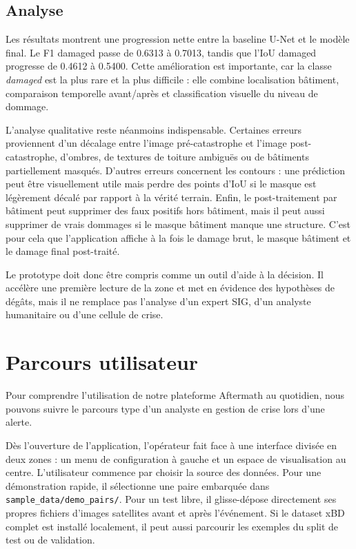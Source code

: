 \documentclass[french,12pt]{article}
\begin{document}
\subsection{Analyse}

Les résultats montrent une progression nette entre la baseline U-Net et le modèle final. Le F1 damaged passe de 0.6313 à 0.7013, tandis que l'IoU damaged progresse de 0.4612 à 0.5400. Cette amélioration est importante, car la classe \textit{damaged} est la plus rare et la plus difficile : elle combine localisation bâtiment, comparaison temporelle avant/après et classification visuelle du niveau de dommage.

L'analyse qualitative reste néanmoins indispensable. Certaines erreurs proviennent d'un décalage entre l'image pré-catastrophe et l'image post-catastrophe, d'ombres, de textures de toiture ambiguës ou de bâtiments partiellement masqués. D'autres erreurs concernent les contours : une prédiction peut être visuellement utile mais perdre des points d'IoU si le masque est légèrement décalé par rapport à la vérité terrain. Enfin, le post-traitement par bâtiment peut supprimer des faux positifs hors bâtiment, mais il peut aussi supprimer de vrais dommages si le masque bâtiment manque une structure. C'est pour cela que l'application affiche à la fois le damage brut, le masque bâtiment et le damage final post-traité.

Le prototype doit donc être compris comme un outil d'aide à la décision. Il accélère une première lecture de la zone et met en évidence des hypothèses de dégâts, mais il ne remplace pas l'analyse d'un expert SIG, d'un analyste humanitaire ou d'une cellule de crise.

\section{Parcours utilisateur}

Pour comprendre l'utilisation de notre plateforme Aftermath au quotidien, nous pouvons suivre le parcours type d'un analyste en gestion de crise lors d'une alerte.

Dès l'ouverture de l'application, l'opérateur fait face à une interface divisée en deux zones : un menu de configuration à gauche et un espace de visualisation au centre. L'utilisateur commence par choisir la source des données. Pour une démonstration rapide, il sélectionne une paire embarquée dans \texttt{sample\_data/demo\_pairs/}. Pour un test libre, il glisse-dépose directement ses propres fichiers d'images satellites avant et après l'événement. Si le dataset xBD complet est installé localement, il peut aussi parcourir les exemples du split de test ou de validation.
\end{document}
